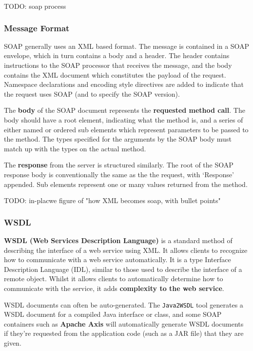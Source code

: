 \documentclass{article}
\begin{document}
TODO: soap process

\subsubsection{Message Format}

SOAP generally uses an XML based format. The message is contained in a SOAP envelope, which in turn contains a body and a header. The header contains instructions to the SOAP processor that receives the message, and the body contains the XML document which constitutes the payload of the request. Namespace declarations and encoding style directives are added to indicate that the request uses SOAP (and to specify the SOAP version). 

The \textbf{body} of the SOAP document represents the \textbf{requested method call}. The body should have a root element, indicating what the method is, and a series of either named or ordered sub elements which represent parameters to be passed to the method. The types specified for the arguments by the SOAP body must match up with the types on the actual method.

The \textbf{response} from the server is structured similarly. The root of the SOAP response body is conventionally the same as the the request, with `Response' appended. Sub elements represent one or many values returned from the method.

TODO: in-placwe figure of "how XML becomes soap, with bullet points"

\subsubsection{WSDL}

\textbf{WSDL (Web Services Description Language)} is a standard method of describing the interface of a web service using XML. It allows clients to recognize how to communicate with a web service automatically. It is a type Interface Description Language (IDL), similar to those used to describe the interface of a remote object. Whilst it allows clients to automatically determine how to communicate with the service, it adds \textbf{complexity to the web service}.

WSDL documents can often be auto-generated. The \texttt{Java2WSDL} tool generates a WSDL document for a compiled Java interface or class, and some SOAP containers such as \textbf{Apache Axis} will automatically generate WSDL documents if they're requested from the application code (such as a JAR file) that they are given. 
\end{document}
